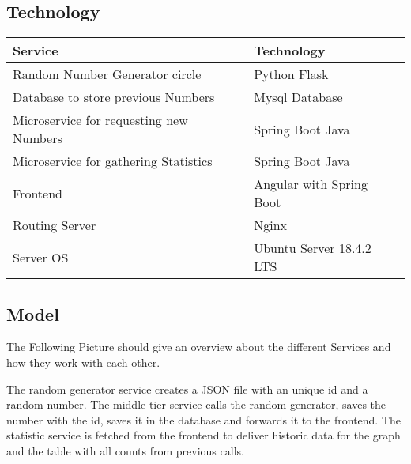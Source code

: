 \subsection{Technology}
\begin{table}[h]
\begin{tabular}{ll}
\textbf{Service} & \textbf{Technology}  \\ \hline
Random Number Generator circle& Python Flask \\
Database to store previous Numbers & Mysql Database \\
Microservice for requesting new Numbers & Spring Boot Java \\
Microservice for gathering Statistics & Spring Boot Java \\
Frontend & Angular with Spring Boot \\
Routing Server & Nginx \\
Server OS & Ubuntu Server 18.4.2  LTS
\end{tabular}
\end{table}
\subsection{Model}
The Following Picture should give an overview about the different Services and how they work with each other.

The random generator service creates a JSON file with an unique id and a random number. The middle tier service calls the random generator, saves the number with the id, saves it in the database and forwards it to the frontend.
The statistic service is fetched from the frontend to deliver historic data for the graph and the table with all counts from previous calls.
